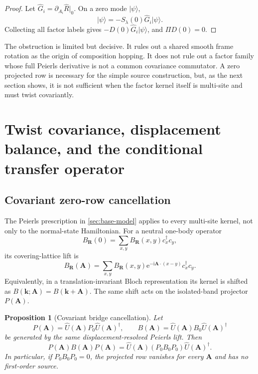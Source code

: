 \documentclass[11pt]{article}
\newtheorem{proposition}[theorem]{Proposition}
\theoremstyle{remark}
\newcommand{\ket}[1]{\lvert #1\rangle}
\newcommand{\I}{\mathrm i}
\newcommand{\e}{\mathrm e}
\newcommand{\bmk}{\bm k}
\begin{document}
\begin{proof}
Let $\widehat G_i=\partial_{A_i}\widehat R|_0$.  On a zero mode $\ket\psi$,
\begin{equation}
[\widehat G_i,S_\lambda(0)]\ket\psi
=-S_\lambda(0)\widehat G_i\ket\psi.
\end{equation}
Collecting all factor labels gives $-D(0)\widehat G_i\ket\psi$, and $\Pi D(0)=0$.
\end{proof}

The obstruction is limited but decisive.  It rules out a shared smooth frame rotation as the origin of composition hopping.  It does not rule out a factor family whose full Peierls derivative is not a common covariance commutator.  A zero projected row is necessary for the simple source construction, but, as the next section shows, it is not sufficient when the factor kernel itself is multi-site and must twist covariantly.

\section{Twist covariance, displacement balance, and the conditional transfer operator}
\label{sec:twist-covariance}

\subsection{Covariant zero-row cancellation}

The Peierls prescription in \cref{sec:base-model} applies to every multi-site kernel, not only to the normal-state Hamiltonian.  For a neutral one-body operator
\begin{equation}
 B_{\bm R}(0)=\sum_{x,y}B_{\bm R}(x,y)c_x^\dagger c_y,
\end{equation}
its covering-lattice lift is
\begin{equation}
 B_{\bm R}(\bm A)=\sum_{x,y}B_{\bm R}(x,y)
 \e^{-\I\bm A\cdot(x-y)}c_x^\dagger c_y.
 \label{eq:bridge-peierls}
\end{equation}
Equivalently, in a translation-invariant Bloch representation its kernel is shifted as $B(\bmk;\bm A)=B(\bmk+\bm A)$.  The same shift acts on the isolated-band projector $P(\bm A)$.

\begin{proposition}[Covariant bridge cancellation]
\label{prop:covariant-bridge}
Let
\begin{equation*}
P(\bm A)=\widehat U(\bm A)P_0\widehat U(\bm A)^\dagger,
\qquad
B(\bm A)=\widehat U(\bm A)B_0\widehat U(\bm A)^\dagger
\end{equation*}
be generated by the same displacement-resolved Peierls lift.  Then
\begin{equation}
 P(\bm A)B(\bm A)P(\bm A)
 =\widehat U(\bm A)(P_0B_0P_0)\widehat U(\bm A)^\dagger.
 \label{eq:covariant-pbp}
\end{equation}
In particular, if $P_0B_0P_0=0$, the projected row vanishes for every $\bm A$ and has no first-order source.
\end{proposition}
\end{document}
